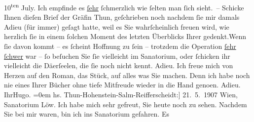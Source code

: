 \begin{ledgroupsized}[t]{13cm}
                     10\textsuperscript{ten} July. Ich empfinde es \uline{ſehr}{ }ſchmerzlich wie
               ſelten man ſich sieht. –\pend
           \pstart
           {\pb}Schicke Ihnen dieſen Brief der
               Gräfin Thun, geſchrieben noch nachdem ſie mir
               damals Adieu (für immer) geſagt hatte, weil es Sie wahrſcheinlich freuen wird, wie
               herzlich ſie in einem ſolchen Moment des letzten Überblicks Ihrer gedenkt.\hspace*{1.5em}Wenn ſie davon kommt – es {\pb}ſcheint Hoffnung zu ſein –
               trotzdem die Operation \uline{ſehr}{ }\uline{ſchwer} war – ſo beſuchen Sie ſie
               vielleicht im Sanatorium, oder
               ſchicken ihr vielleicht die Dä{\geminationm}erſeelen, die ſie noch nicht kennt.\pend
           \pstart
           Adieu. Ich freue mich von Herzen auf den Roman, das Stück, auf
               alles was Sie machen. {\pb}Denn ich
               habe noch nie eines Ihrer Bücher ohne tiefe Mitfreude wieder in die Hand geno{\geminationm}en.\pend
           \pstart
           Adieu.{\\[\baselineskip]}Ihr\spacefill\mbox{Hugo.}\pend
           \leftskip=0em{}{\bigskip}\pstart
           \raggedleft{}{\pb}{[}hs. Thun-Hohenstein-Salm-Reifferscheidt:{]} 21. 5. 1907\pend
           \pstart
           \raggedleft{}Wien, Sanatorium Löw.\pend
           \pstart
           Ich habe mich sehr gefreut, Sie heute noch zu sehen. Nachdem Sie bei mir waren, bin
               ich ins Sanatorium gefahren. Es

\end{ledgroupsized}
